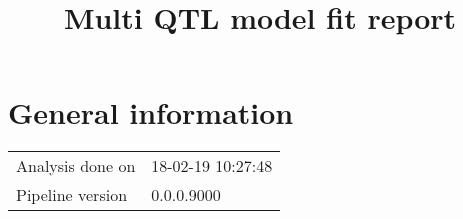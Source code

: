 \documentclass[a4paper,11pt]{article}\usepackage[]{graphicx}\usepackage[]{color}
\title{Multi QTL model fit report}%
\author{\vspace{-5ex}}
\date{\vspace{-5ex}}
\begin{document}


\maketitle
\singlespacing

\section{General information}
\begin{table}[ht]
\begin{flushleft}
\begin{tabular}{ll}
  Analysis done on & 18-02-19 10:27:48 \\ 
  Pipeline version & 0.0.0.9000 \\ 
  \end{tabular}
\label{general}
\end{flushleft}
\end{table}


\end{document}
